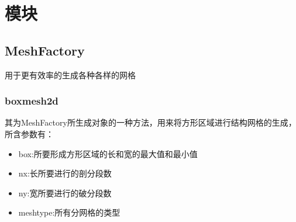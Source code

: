 \newpage
\section{模块}
\subsection{MeshFactory}
用于更有效率的生成各种各样的网格
\subsubsection{boxmesh2d}
其为MeshFactory所生成对象的一种方法，用来将方形区域进行结构网格的生成，所含参数有：
\begin{itemize}
	\item box:所要形成方形区域的长和宽的最大值和最小值
	\item nx:长所要进行的剖分段数
	\item ny:宽所要进行的破分段数
	\item meshtype:所有分网格的类型
\end{itemize}

